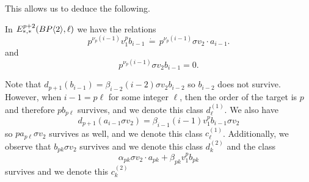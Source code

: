 This allows us to deduce the following. 

\begin{cor}
	In $E_{*,*}^{p+2}(BP\langle 2 \rangle,\ell)$ we have the relations
	\[
	p^{\nu_p(i-1)}v_1^pb_{i-1}\,\dot{=}\,p^{\nu_p(i-1)}\sigma v_2\cdot a_{i-1}.
	\]
	and 
	\[
	p^{\nu_p(i-1)}\sigma v_2 b_{i-1}=0.
	\]
\end{cor}

Note that $d_{p+1}(b_{i-1})=\beta_{i-2}(i-2)\sigma v_2 b_{i-2}$ so $b_{i-2}$ does not survive. However, when $i-1=p\ell$ for some integer $\ell$, then the order of the target is $p$ and therefore $pb_{p\ell}$ survives, and we denote this class $d_{\ell}^{(1)}$. We also have 
\[ d_{p+1}(a_{i-1} \sigma v_2)= \beta_{i-1}(i-1)v_1^pb_{i-1}\sigma v_2\]
so $pa_{p\ell}\sigma v_2$ survives as well, and we denote this class $c_{\ell}^{(1)}$. Additionally, we observe that $b_{pk}\sigma v_2$ survives and we denote this class $d_{k}^{(2)}$ and the class
\[ \alpha_{pk}\sigma v_2 \cdot a_{pk}+ \beta_{pk}v_1^{p} b_{pk} \]
survives and we denote this $c_{k}^{(2)}$

